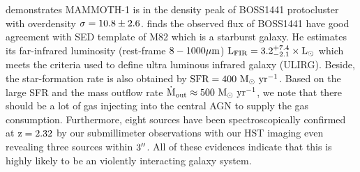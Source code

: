 \documentclass{subfiles}
\begin{document}
\citet{cai2017mapping} demonstrates MAMMOTH-1 is in the density peak of BOSS1441 protocluster with overdensity $\rm \sigma=10.8 \pm 2.6$. \citet{arrigoni2018overdensity} finds the observed flux of BOSS1441 have good agreement with SED template of M82 which is a starburst galaxy. He estimates its far-infrared luminosity (rest-frame $\rm 8-1000\mu m$) $\rm L_{FIR}=3.2^{+7.4}_{-2.1} \times L_{\odot}$ which meets the criteria used to define ultra luminous infrared galaxy (ULIRG). Beside, the star-formation rate is also obtained by $\rm SFR=400 \ M_{\odot} \ yr^{-1}$. Based on the large SFR and the mass outflow rate $\rm \dot{M}_{out} \approx 500 \ M_{\odot} \ yr^{-1}$, we note that there should be a lot of gas injecting into the central AGN to supply the gas consumption. Furthermore, eight sources have been spectroscopically confirmed at $\rm z=2.32$ by our submillimeter observations \citep{qiongli2020} with our HST imaging even revealing three sources within $3\mbox{$^{\prime\prime}$}$. All of these evidences indicate that this is highly likely to be an violently interacting galaxy system.
	
\end{document}
